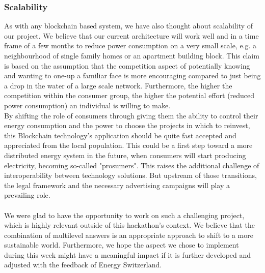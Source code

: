 \documentclass[11pt]{article}
\begin{document}
\subsubsection{Scalability}
As with any blockchain based system, we have also thought about scalability of our project. We believe that our current architecture will work well and in a time frame of a few months to reduce power consumption on a very small scale, e.g. a neighbourhood of single family homes or an apartment building block. This claim is based on the assumption that the competition aspect of potentially knowing and wanting to one-up a familiar face is more encouraging compared to just being a drop in the water of a large scale network. Furthermore, the higher the competition within the consumer group, the higher the potential effort (reduced power consumption) an individual is willing to make.\\
By shifting the role of consumers through giving them the ability to control their energy consumption and the power to choose the projects in which to reinvest, this Blockchain technology's application should be quite fast accepted and appreciated from the local population. This could be a first step toward a more distributed energy system in the future, when consumers will start producing electricity, becoming so-called "prosumers". This raises the additional challenge of interoperability between technology solutions. But upstream of those transitions, the legal framework and the necessary advertising campaigns will play a prevailing role.\cite{25}\\\\
We were glad to have the opportunity to work on such a challenging project, which is highly relevant outside of this hackathon's context. We believe that the combination of multilevel answers is an appropriate approach to shift to a more sustainable world. Furthermore, we hope the aspect we chose to implement during this week might have a meaningful impact if it is further developed and adjusted with the feedback of Energy Switzerland.
\end{document}
